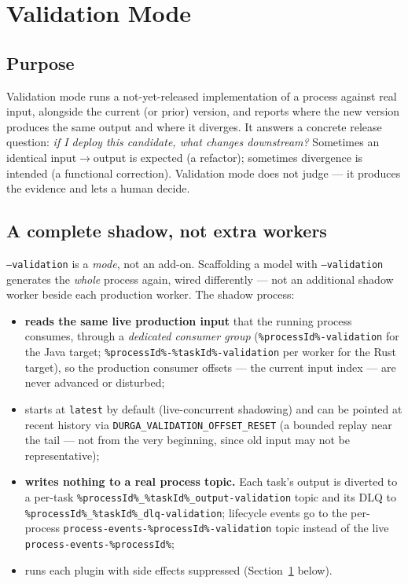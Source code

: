 \section{Validation Mode}
\label{sec:ValidationMode}

\subsection{Purpose}

Validation mode runs a not-yet-released implementation of a process against real
input, alongside the current (or prior) version, and reports where the new version
produces the same output and where it diverges. It answers a concrete release
question: \emph{if I deploy this candidate, what changes downstream?} Sometimes an
identical input$\rightarrow$output is expected (a refactor); sometimes divergence is
intended (a functional correction). Validation mode does not judge --- it produces the
evidence and lets a human decide.

\subsection{A complete shadow, not extra workers}

\texttt{--validation} is a \emph{mode}, not an add-on. Scaffolding a model with
\texttt{--validation} generates the \emph{whole} process again, wired differently ---
not an additional shadow worker beside each production worker. The shadow process:
\begin{itemize}
\item \textbf{reads the same live production input} that the running process consumes,
  through a \emph{dedicated consumer group} (\texttt{\%processId\%-validation} for the
  Java target; \texttt{\%processId\%-\%taskId\%-validation} per worker for the Rust
  target), so the production consumer offsets --- the current input index --- are never
  advanced or disturbed;
\item starts at \texttt{latest} by default (live-concurrent shadowing) and can be
  pointed at recent history via \texttt{DURGA\_VALIDATION\_OFFSET\_RESET} (a bounded
  replay near the tail --- not from the very beginning, since old input may not be
  representative);
\item \textbf{writes nothing to a real process topic.} Each task's output is diverted to
  a per-task \texttt{\%processId\%\_\%taskId\%\_output-validation} topic and its DLQ to
  \texttt{\%processId\%\_\%taskId\%\_dlq-validation}; lifecycle events go to the per-process
  \texttt{process-events-\%processId\%-validation} topic instead of the live \texttt{process-events-\%processId\%};
\item runs each plugin with side effects suppressed (Section~\ref{sec:ValidationMode}
  below).
\end{itemize}

